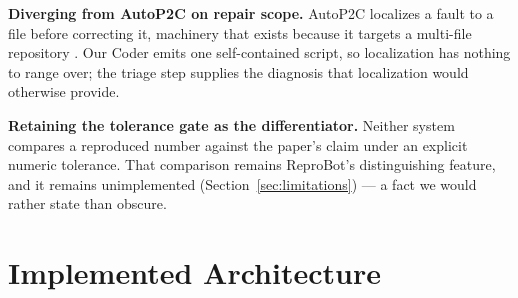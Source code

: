 \documentclass[10pt,twocolumn]{article}
\begin{document}
\textbf{Diverging from AutoP2C on repair scope.} AutoP2C localizes a fault to a file
before correcting it, machinery that exists because it targets a multi-file repository
\cite{lin2025autop2c}. Our Coder emits one self-contained script, so localization has
nothing to range over; the triage step supplies the diagnosis that localization would
otherwise provide.

\textbf{Retaining the tolerance gate as the differentiator.} Neither system compares a
reproduced number against the paper's claim under an explicit numeric tolerance. That
comparison remains ReproBot's distinguishing feature, and it remains unimplemented
(Section~\ref{sec:limitations}) --- a fact we would rather state than obscure.

\section{Implemented Architecture}
\label{sec:architecture}
\end{document}
